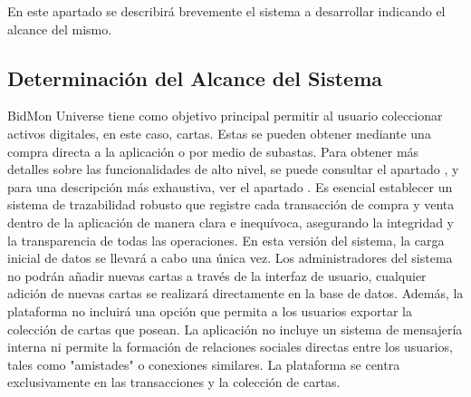 En este apartado se describirá brevemente el sistema a desarrollar indicando el alcance del mismo.
\subsection{Determinación del Alcance del Sistema}
BidMon Universe tiene como objetivo principal permitir al usuario coleccionar activos digitales, en este caso, cartas. Estas se pueden obtener mediante una compra directa a la aplicación o por medio de subastas. Para obtener más detalles sobre las funcionalidades de alto nivel, se puede consultar el apartado , y para una descripción más exhaustiva, ver el apartado .
Es esencial establecer un sistema de trazabilidad robusto que registre cada transacción de compra y venta dentro de la aplicación de manera clara e inequívoca, asegurando la integridad y la transparencia de todas las operaciones.
En esta versión del sistema, la carga inicial de datos se llevará a cabo una única vez. Los administradores del sistema no podrán añadir nuevas cartas a través de la interfaz de usuario, cualquier adición de nuevas cartas se realizará directamente en la base de datos. Además, la plataforma no incluirá una opción que permita a los usuarios exportar la colección de cartas que posean.
La aplicación no incluye un sistema de mensajería interna ni permite la formación de relaciones sociales directas entre los usuarios, tales como "amistades" o conexiones similares. La plataforma se centra exclusivamente en las transacciones y la colección de cartas.



